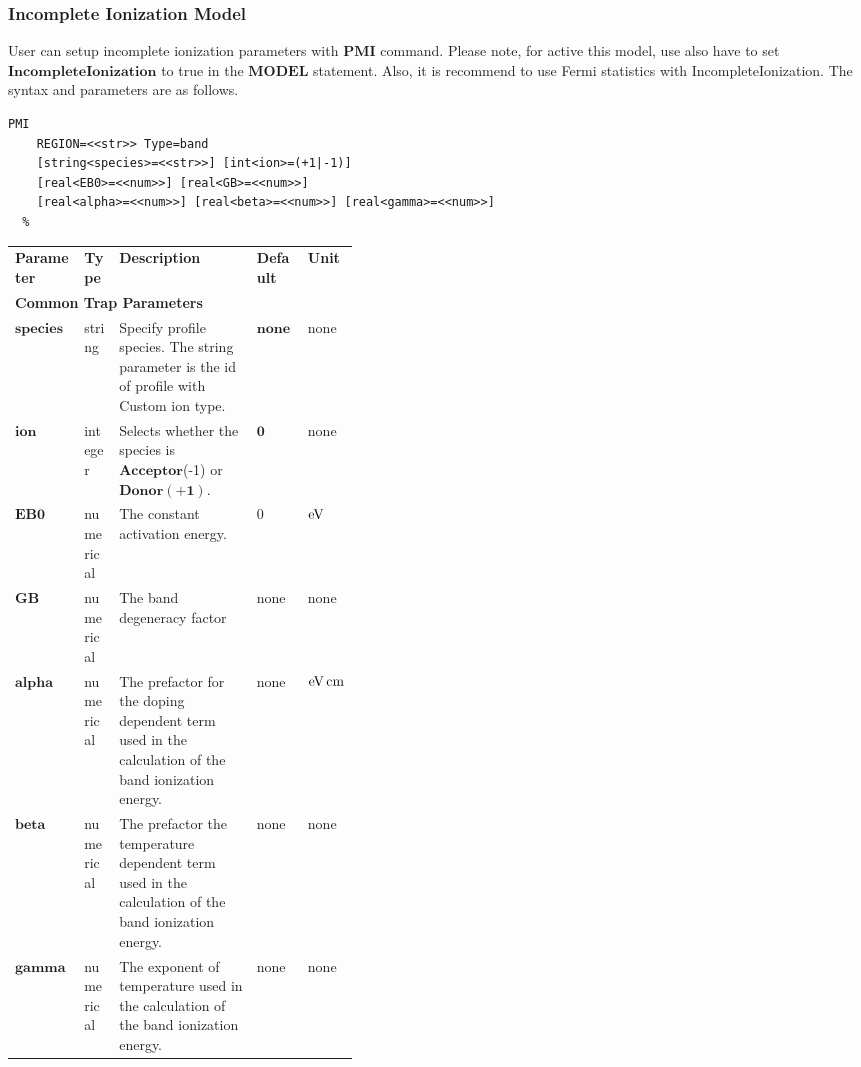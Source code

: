 \documentclass[oneside,12pt]{cgd_book}
\begin{document}
\subsubsection{Incomplete Ionization Model}
User can setup incomplete ionization parameters with $\mathbf{PMI}$
command. Please note, for
          active this model, use also have to set $\mathbf{IncompleteIonization}$
to true in the $\mathbf{MODEL}$ statement. Also, it is recommend to use Fermi statistics with IncompleteIonization.
          The syntax and parameters are as follows.
\par
\begin{lstlisting}[style=GeniusCmd]
PMI
    REGION=<<str>> Type=band
    [string<species>=<<str>>] [int<ion>=(+1|-1)]
    [real<EB0>=<<num>>] [real<GB>=<<num>>]
    [real<alpha>=<<num>>] [real<beta>=<<num>>] [real<gamma>=<<num>>]
  %
\end{lstlisting}
\begin{longtable}{ll>{\raggedright}p{0.4\linewidth}ll}
\textbf{Parameter} & \textbf{Type} & \textbf{Description} & \textbf{Default} & \textbf{Unit} \\
\multicolumn{5}{l}{\textbf{Common Trap Parameters}}
\\
 $\mathbf{species}$
& string
& Specify profile species. The string parameter is the id of profile with Custom ion
                    type.
& $\mathbf{none}$
& none
\\
 $\mathbf{ion}$
& integer
& Selects whether the species is $\mathbf{Acceptor}$(-1) or $\mathbf{Donor(+1)}$.
& $\mathbf{0}$
& none
\\
 $\mathbf{EB0}$
& numerical
& The constant activation energy.
& 0
& $\text{eV}$
\\
 $\mathbf{GB}$
& numerical
& The band degeneracy factor
& none
& none
\\
 $\mathbf{alpha}$
& numerical
& The prefactor for the doping dependent term used in the calculation of the band ionization
                    energy.
& none
& $\text{eV}\,\text{cm}$
\\
 $\mathbf{beta}$
& numerical
& The prefactor the temperature dependent term used in the calculation of the band ionization
                    energy.
& none
& none
\\
 $\mathbf{gamma}$
& numerical
& The exponent of temperature used in the calculation of the band ionization energy.
& none
& none\\
\end{longtable}

\par
\end{document}
